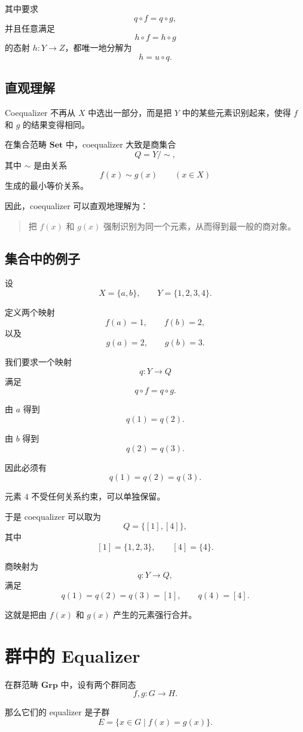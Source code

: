 \documentclass[UTF8, a4paper, 12pt]{ctexart}
\newcommand{\Set}{\mathbf{Set}}
\newcommand{\Grp}{\mathbf{Grp}}
\begin{document}
其中要求
\[
q\circ f=q\circ g,
\]
并且任意满足
\[
h\circ f=h\circ g
\]
的态射 \(h\colon Y\to Z\)，都唯一地分解为
\[
h=u\circ q.
\]

\subsection{直观理解}

Coequalizer 不再从 \(X\) 中选出一部分，而是把 \(Y\) 中的某些元素识别起来，使得 \(f\) 和 \(g\) 的结果变得相同。

在集合范畴 \(\Set\) 中，coequalizer 大致是商集合
\[
Q=Y/{\sim},
\]
其中 \(\sim\) 是由关系
\[
f(x)\sim g(x)\qquad (x\in X)
\]
生成的最小等价关系。

因此，coequalizer 可以直观地理解为：

\begin{quote}
把 \(f(x)\) 和 \(g(x)\) 强制识别为同一个元素，从而得到最一般的商对象。
\end{quote}

\subsection{集合中的例子}

设
\[
X=\{a,b\},\qquad Y=\{1,2,3,4\}.
\]

定义两个映射
\[
f(a)=1,\qquad f(b)=2,
\]
以及
\[
g(a)=2,\qquad g(b)=3.
\]

我们要求一个映射
\[
q\colon Y\to Q
\]
满足
\[
q\circ f=q\circ g.
\]

由 \(a\) 得到
\[
q(1)=q(2).
\]

由 \(b\) 得到
\[
q(2)=q(3).
\]

因此必须有
\[
q(1)=q(2)=q(3).
\]

元素 \(4\) 不受任何关系约束，可以单独保留。

于是 coequalizer 可以取为
\[
Q=\{[1],[4]\},
\]
其中
\[
[1]=\{1,2,3\},\qquad [4]=\{4\}.
\]

商映射为
\[
q\colon Y\to Q,
\]
满足
\[
q(1)=q(2)=q(3)=[1],
\qquad
q(4)=[4].
\]

这就是把由 \(f(x)\) 和 \(g(x)\) 产生的元素强行合并。

\section{群中的 Equalizer}

在群范畴 \(\Grp\) 中，设有两个群同态
\[
f,g\colon G\to H.
\]

那么它们的 equalizer 是子群
\[
E=\{x\in G\mid f(x)=g(x)\}.
\]
\end{document}
